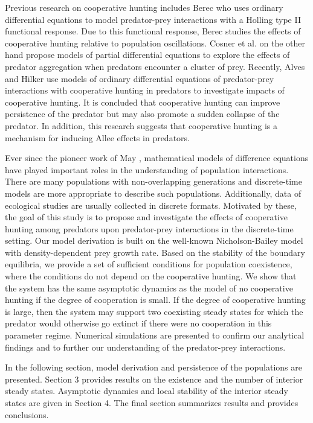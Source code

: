 \documentclass[11pt]{article}
\begin{document}
Previous research  on cooperative hunting includes Berec
\cite{berec} who uses ordinary differential equations to model
predator-prey interactions with a Holling type II functional
response. Due to this functional response, Berec studies the
effects of cooperative hunting relative to population
oscillations. Cosner et al. \cite{cosner} on the other hand
propose models of partial differential equations to explore the
effects of predator aggregation when predators encounter a cluster
of prey.  Recently, Alves and Hilker \cite{alves} use models of
ordinary differential equations of predator-prey interactions with
cooperative hunting in predators to investigate  impacts of
cooperative hunting. It is concluded that cooperative hunting can
improve persistence of the predator but may also promote a sudden
collapse of the predator. In addition, this research suggests that
cooperative hunting is a mechanism for inducing Allee effects in
predators.


Ever since the pioneer work of May \cite{may}, mathematical models
of difference equations have played  important roles in the
understanding of population interactions. There are many
populations with non-overlapping generations and discrete-time
models are more appropriate to describe such populations.
Additionally, data of ecological studies are usually collected in
discrete formats. Motivated by these, the goal of this study is to
propose and  investigate the effects of cooperative hunting among
predators upon predator-prey interactions in the discrete-time
setting. Our model derivation is built on the well-known
Nicholson-Bailey model with density-dependent prey growth rate.
Based on the stability of the boundary equilibria, we provide a
set of sufficient conditions for population coexistence, where the
conditions do not depend on the cooperative hunting. We show that
the system has the same asymptotic dynamics as the model of no
cooperative hunting if the degree of cooperation is small. If the
degree of cooperative hunting is large, then the system may
support two coexisting steady states for which the predator would
otherwise go extinct if there were no cooperation in this
parameter regime. Numerical simulations are presented to confirm
our analytical findings and to further our understanding of the
predator-prey interactions.

In the following section, model derivation and persistence of the
populations are presented. Section 3 provides results on the
existence and the number of interior steady states. Asymptotic
dynamics and local stability of the interior steady states are
given in Section 4. The final section summarizes results and
provides conclusions.
\end{document}

